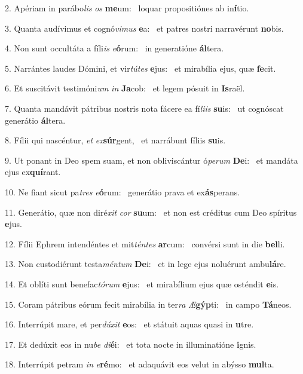2. Apériam in parábo\textit{lis} \textit{os} \textbf{me}um: \ast\  loquar propositiónes ab in\textbf{í}tio.\

3. Quanta audívimus et cognó\textit{vi}\textit{mus} \textbf{e}a: \ast\  et patres nostri narravérunt \textbf{no}bis.\

4. Non sunt occultáta a fíli\textit{is} \textit{e}\textbf{ó}rum: \ast\  in generatióne \textbf{ál}tera.\

5. Narrántes laudes Dómini, et vir\textit{tú}\textit{tes} \textbf{e}jus: \ast\  et mirabília ejus, quæ \textbf{fe}cit.\

6. Et suscitávit testimóni\textit{um} \textit{in} \textbf{Ja}cob: \ast\  et legem pósuit in \textbf{Is}raël.\

7. Quanta mandávit pátribus nostris nota fácere ea fí\textit{li}\textit{is} \textbf{su}is: \ast\  ut cognóscat generátio \textbf{ál}tera.\

8. Fílii qui nascéntur, \textit{et} \textit{ex}\textbf{súr}gent, \ast\  et narrábunt fíliis \textbf{su}is.\

9. Ut ponant in Deo spem suam, et non obliviscántur ó\textit{pe}\textit{rum} \textbf{De}i: \ast\  et mandáta ejus ex\textbf{quí}rant.\

10. Ne fiant sicut pa\textit{tres} \textit{e}\textbf{ó}rum: \ast\  generátio prava et ex\textbf{ás}perans.\

11. Generátio, quæ non diré\textit{xit} \textit{cor} \textbf{su}um: \ast\  et non est créditus cum Deo spíritus \textbf{e}jus.\

12. Fílii Ephrem intendéntes et mit\textit{tén}\textit{tes} \textbf{ar}cum: \ast\  convérsi sunt in die \textbf{bel}li.\

13. Non custodiérunt testa\textit{mén}\textit{tum} \textbf{De}i: \ast\  et in lege ejus noluérunt ambu\textbf{lá}re.\

14. Et oblíti sunt benefac\textit{tó}\textit{rum} \textbf{e}jus: \ast\  et mirabílium ejus quæ osténdit \textbf{e}is.\

15. Coram pátribus eórum fecit mirabília in ter\textit{ra} \textit{Æ}\textbf{gýp}ti: \ast\  in campo \textbf{Tá}neos.\

16. Interrúpit mare, et per\textit{dú}\textit{xit} \textbf{e}os: \ast\  et státuit aquas quasi in \textbf{u}tre.\

17. Et dedúxit eos in nu\textit{be} \textit{di}\textbf{é}i: \ast\  et tota nocte in illuminatióne \textbf{i}gnis.\

18. Interrúpit petram \textit{in} \textit{e}\textbf{ré}mo: \ast\  et adaquávit eos velut in abýsso \textbf{mul}ta.\


